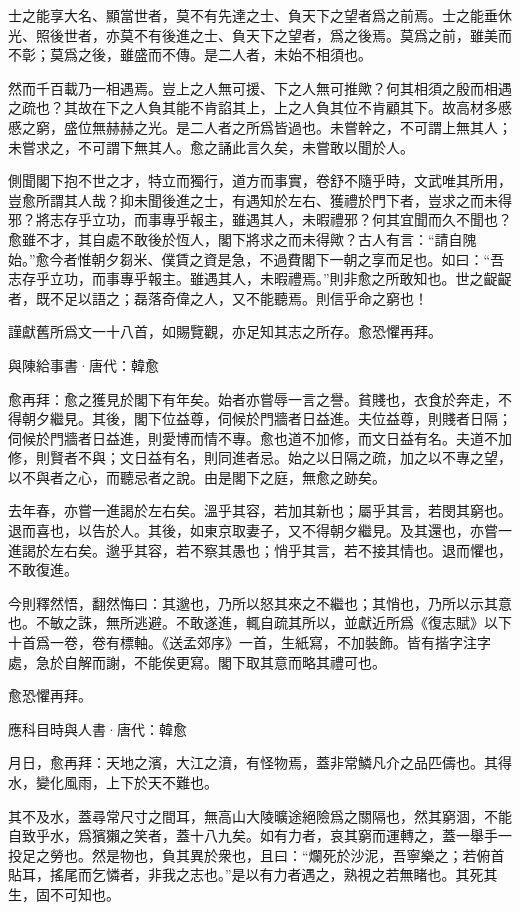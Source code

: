 \documentclass[12pt,a4paper]{ctexbook}
\begin{document}
士之能享大名、顯當世者，莫不有先達之士、負天下之望者爲之前焉。士之能垂休光、照後世者，亦莫不有後進之士、負天下之望者，爲之後焉。莫爲之前，雖美而不彰；莫爲之後，雖盛而不傳。是二人者，未始不相須也。\par
然而千百載乃一相遇焉。豈上之人無可援、下之人無可推歟？何其相須之殷而相遇之疏也？其故在下之人負其能不肯諂其上，上之人負其位不肯顧其下。故高材多慼慼之窮，盛位無赫赫之光。是二人者之所爲皆過也。未嘗幹之，不可謂上無其人；未嘗求之，不可謂下無其人。愈之誦此言久矣，未嘗敢以聞於人。\par
側聞閣下抱不世之才，特立而獨行，道方而事實，卷舒不隨乎時，文武唯其所用，豈愈所謂其人哉？抑未聞後進之士，有遇知於左右、獲禮於門下者，豈求之而未得邪？將志存乎立功，而事專乎報主，雖遇其人，未暇禮邪？何其宜聞而久不聞也？愈雖不才，其自處不敢後於恆人，閣下將求之而未得歟？古人有言：“請自隗始。”愈今者惟朝夕芻米、僕賃之資是急，不過費閣下一朝之享而足也。如曰：“吾志存乎立功，而事專乎報主。雖遇其人，未暇禮焉。”則非愈之所敢知也。世之齪齪者，既不足以語之；磊落奇偉之人，又不能聽焉。則信乎命之窮也！\par
謹獻舊所爲文一十八首，如賜覽觀，亦足知其志之所存。愈恐懼再拜。\par
與陳給事書·唐代：韓愈 \par
愈再拜：愈之獲見於閣下有年矣。始者亦嘗辱一言之譽。貧賤也，衣食於奔走，不得朝夕繼見。其後，閣下位益尊，伺候於門牆者日益進。夫位益尊，則賤者日隔；伺候於門牆者日益進，則愛博而情不專。愈也道不加修，而文日益有名。夫道不加修，則賢者不與；文日益有名，則同進者忌。始之以日隔之疏，加之以不專之望，以不與者之心，而聽忌者之說。由是閣下之庭，無愈之跡矣。\par
去年春，亦嘗一進謁於左右矣。溫乎其容，若加其新也；屬乎其言，若閔其窮也。退而喜也，以告於人。其後，如東京取妻子，又不得朝夕繼見。及其還也，亦嘗一進謁於左右矣。邈乎其容，若不察其愚也；悄乎其言，若不接其情也。退而懼也，不敢復進。\par
今則釋然悟，翻然悔曰：其邈也，乃所以怒其來之不繼也；其悄也，乃所以示其意也。不敏之誅，無所逃避。不敢遂進，輒自疏其所以，並獻近所爲《復志賦》以下十首爲一卷，卷有標軸。《送孟郊序》一首，生紙寫，不加裝飾。皆有揩字注字處，急於自解而謝，不能俟更寫。閣下取其意而略其禮可也。\par
愈恐懼再拜。\par
應科目時與人書·唐代：韓愈 \par
月日，愈再拜：天地之濱，大江之濆，有怪物焉，蓋非常鱗凡介之品匹儔也。其得水，變化風雨，上下於天不難也。\par
其不及水，蓋尋常尺寸之間耳，無高山大陵曠途絕險爲之關隔也，然其窮涸，不能自致乎水，爲獱獺之笑者，蓋十八九矣。如有力者，哀其窮而運轉之，蓋一舉手一投足之勞也。然是物也，負其異於衆也，且曰：“爛死於沙泥，吾寧樂之；若俯首貼耳，搖尾而乞憐者，非我之志也。”是以有力者遇之，熟視之若無睹也。其死其生，固不可知也。\par
\end{document}
